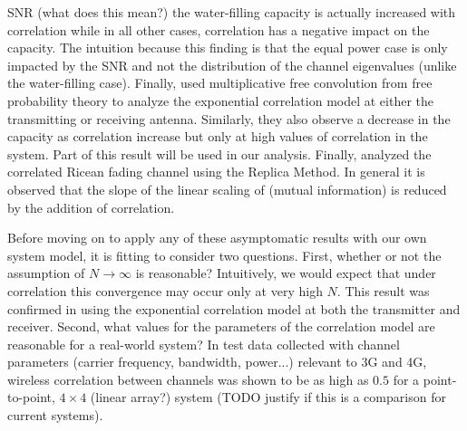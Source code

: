 SNR (what does this mean?) the water-filling capacity is actually increased with correlation while in all other cases, correlation has a negative impact on the capacity. The intuition because this finding is that the equal power case is only impacted by the SNR and not the distribution of the channel eigenvalues (unlike the water-filling case).
Finally, \cite{skupch2005free} used multiplicative free convolution from free probability theory to analyze the exponential correlation model at either the transmitting or receiving antenna. Similarly, they also observe a decrease in the capacity as correlation increase but only at high values of correlation in the system. Part of this result will be used in our analysis. 
Finally,
\cite{taricco2008asymptotic} analyzed the correlated Ricean fading channel using the Replica Method. 
In general it is observed that the slope of the linear scaling of (mutual information) is reduced by the addition of correlation. 
\par
Before moving on to apply any of these asymptomatic results with our own system model, it is fitting to consider two questions. 
First, whether or not the assumption of  $N \rightarrow \infty$ is reasonable? Intuitively, we would expect that under correlation this convergence may occur only at very high $N$. This result was confirmed in  \cite{martin2004asymptotic} using the exponential correlation model at both the transmitter and receiver. 
Second, what values for the parameters of the correlation model are reasonable for a real-world system?
In test data collected with channel parameters (carrier frequency, bandwidth, power...) relevant to 3G and 4G, wireless correlation between channels was shown to be as high as $0.5$ for a point-to-point, $4 \times 4$ (linear array?) system \cite{martin2000multiple} (TODO justify if this is a comparison for current systems).